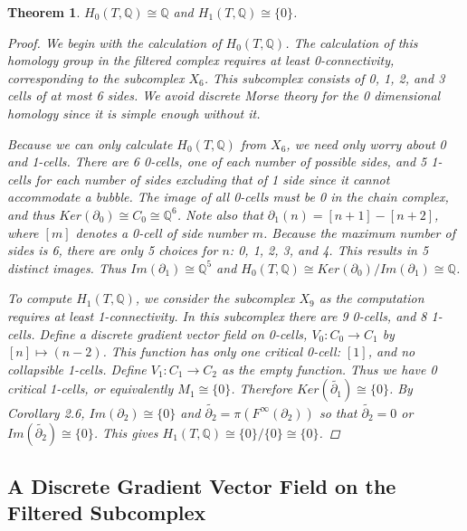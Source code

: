 \documentclass{amsart}
\newtheorem{theorem}{Theorem}[section]
\newcommand{\bq}{\ensuremath{\mathbb{Q}}} %
\begin{document}
\begin{theorem}
$H_{0}(T, \bq) \cong \bq$ and $H_{1}(T, \bq) \cong \{0\}$.

\begin{proof}
	We begin with the calculation of $H_{0}(T, \mathbb{Q})$. The calculation of this homology group in the filtered complex requires at least 0-connectivity, corresponding to the subcomplex $X_{6}$. This subcomplex consists of 0, 1, 2, and 3 cells of at most 6 sides. We avoid discrete Morse theory for the 0 dimensional homology since it is simple enough without it.
	
	Because we can only calculate $H_{0}(T, \mathbb{Q})$ from $X_{6}$, we need only worry about 0 and 1-cells. There are 6 0-cells, one of each number of possible sides, and 5 1-cells for each number of sides excluding that of 1 side since it cannot accommodate a bubble. The image of all 0-cells must be 0 in the chain complex, and thus $Ker(\partial_{0}) \cong C_{0} \cong \mathbb{Q}^6$. Note also that $\partial_{1}(n) = [n+1] - [n+2]$, where $[m]$ denotes a 0-cell of side number $m$. Because the maximum number of sides is 6, there are only 5 choices for $n$: 0, 1, 2, 3, and 4. This results in 5 distinct images. Thus $Im(\partial_{1}) \cong \mathbb{Q}^{5}$ and $H_{0}(T, \mathbb{Q}) \cong Ker(\partial_{0})/Im(\partial_{1}) \cong \mathbb{Q}$.
	
	
	To compute $H_{1}(T, \mathbb{Q})$, we consider the subcomplex $X_{9}$  as the computation requires at least 1-connectivity. In this subcomplex there are 9 0-cells, and 8 1-cells. Define a discrete gradient vector field on 0-cells, $V_{0}: C_{0} \to C_{1}$ by $[n] \mapsto (n-2)$. This function has only one critical 0-cell: $[1]$, and no collapsible 1-cells. Define $V_{1}: C_{1} \to C_{2}$ as the empty function. Thus we have 0 critical 1-cells, or equivalently $M_{1} \cong \{0\}$. Therefore $Ker(\widetilde{\partial_{1}}) \cong \{0\}$. By Corollary 2.6, $Im(\partial_{2}) \cong \{0\}$ and $\widetilde{\partial_{2}} = \pi(F^{\infty}(\partial_{2}))$ so that $\widetilde{\partial_{2}} = 0$ or $Im(\widetilde{\partial_{2}}) \cong \{0\}$. This gives $H_{1}(T, \mathbb{Q}) \cong \{0\}/\{0\} \cong \{0\}$.
\end{proof}

\end{theorem}

\subsection{A Discrete Gradient Vector Field on the Filtered Subcomplex}
\end{document}
